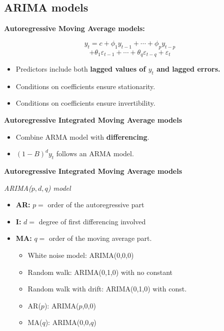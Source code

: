 \documentclass[]{book}
\providecommand{\tightlist}{%
  \setlength{\itemsep}{0pt}\setlength{\parskip}{0pt}}
\begin{document}
\hypertarget{arima-models-1}{%
\subsection{ARIMA models}\label{arima-models-1}}

\textbf{Autoregressive Moving Average models:}

\[y_{t} = c + \phi_{1}y_{t - 1} + \cdots + \phi_{p}y_{t - p}\]
\[+ \theta_{1}\varepsilon_{t - 1} + \cdots + \theta_{q}\varepsilon_{t - q} + \varepsilon_{t}\]

\begin{itemize}
\tightlist
\item
  Predictors include both \textbf{lagged values of \(y_t\) and lagged errors.}
\item
  Conditions on coefficients ensure stationarity.
\item
  Conditions on coefficients ensure invertibility.
\end{itemize}

\textbf{Autoregressive Integrated Moving Average models}

\begin{itemize}
\tightlist
\item
  Combine ARMA model with \textbf{differencing}.
\item
  \((1-B)^d y_t\) follows an ARMA model.
\end{itemize}

\textbf{Autoregressive Integrated Moving Average models}

\emph{ARIMA(\(p, d, q\)) model}

\begin{itemize}
\item
  \textbf{AR:} \(p =\) order of the autoregressive part
\item
  \textbf{I:} \(d =\) degree of first differencing involved
\item
  \textbf{MA:} \(q =\) order of the moving average part.

  \begin{itemize}
  \tightlist
  \item
    White noise model: ARIMA(0,0,0)
  \item
    Random walk: ARIMA(0,1,0) with no constant
  \item
    Random walk with drift: ARIMA(0,1,0) with const.
  \item
    AR(\(p\)): ARIMA(\(p\),0,0)
  \item
    MA(\(q\)): ARIMA(0,0,\(q\))
  \end{itemize}
\end{itemize}
\end{document}

